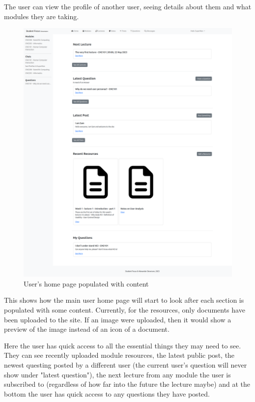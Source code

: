 The user can view the profile of another user, seeing details about them and what modules they are taking.

\begin{figure}[H]
\centering
\includegraphics[scale=0.20]{images/application/34 - home_page_populated.png}
\caption{User's home page populated with content}
\label{fig:figure2}
\end{figure}

This shows how the main user home page will start to look after each section is populated with some content. Currently, for the resources, only documents have been uploaded to the site. If an image were uploaded, then it would show a preview of the image instead of an icon of a document. 

Here the user has quick access to all the essential things they may need to see. They can see recently uploaded module resources, the latest public post, the newest questing posted by a different user (the current user's question will never show under "latest question"), the next lecture from any module the user is subscribed to (regardless of how far into the future the lecture maybe) and at the bottom the user has quick access to any questions they have posted.

